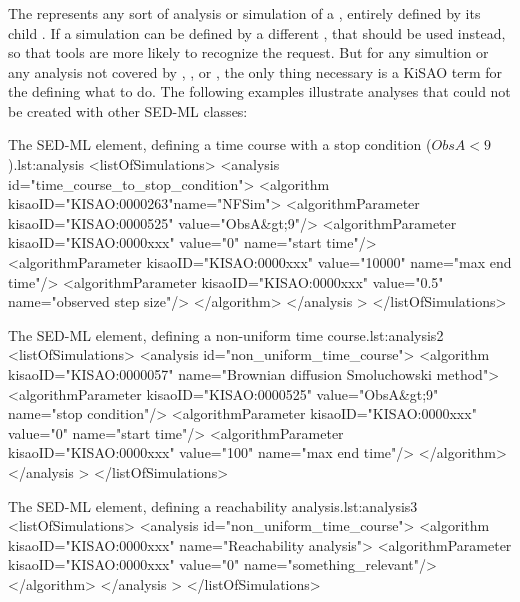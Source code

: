 \begin{blockChanged}
\subsubsection{}
\label{class:analysis}
The  represents any sort of analysis or simulation of a \Model, entirely defined by its child \Algorithm.  If a simulation can be defined by a different \Simulation, that should be used instead, so that tools are more likely to recognize the request.  But for any simultion or any analysis not covered by \SteadyState, \OneStep, or \UniformTimeCourse, the only thing necessary is a KiSAO term for the \Algorithm defining what to do.  The following examples illustrate analyses that could not be created with other SED-ML \Simulation classes:


\begin{myXmlLst}{The SED-ML  element, defining a time course with a stop condition ($ObsA<9$).}{lst:analysis}
<listOfSimulations>
    <analysis id="time_course_to_stop_condition">
        <algorithm kisaoID="KISAO:0000263"name="NFSim">
            <algorithmParameter kisaoID="KISAO:0000525" value="ObsA&gt;9"/>
            <algorithmParameter kisaoID="KISAO:0000xxx" value="0" name="start time"/>
            <algorithmParameter kisaoID="KISAO:0000xxx" value="10000" name="max end time"/>
            <algorithmParameter kisaoID="KISAO:0000xxx" value="0.5" name="observed step size"/>
        </algorithm>
    </analysis >
</listOfSimulations>
\end{myXmlLst}


\begin{myXmlLst}{The SED-ML  element, defining a non-uniform time course.}{lst:analysis2}
<listOfSimulations>
    <analysis id="non_uniform_time_course">
        <algorithm kisaoID="KISAO:0000057" name="Brownian diffusion Smoluchowski method">
            <algorithmParameter kisaoID="KISAO:0000525" value="ObsA&gt;9" name="stop condition"/>
            <algorithmParameter kisaoID="KISAO:0000xxx" value="0" name="start time"/>
            <algorithmParameter kisaoID="KISAO:0000xxx" value="100" name="max end time"/>
        </algorithm>
    </analysis >
</listOfSimulations>
\end{myXmlLst}


\begin{myXmlLst}{The SED-ML  element, defining a reachability analysis.}{lst:analysis3}
<listOfSimulations>
    <analysis id="non_uniform_time_course">
        <algorithm kisaoID="KISAO:0000xxx" name="Reachability analysis">
            <algorithmParameter kisaoID="KISAO:0000xxx" value="0" name="something_relevant"/>
        </algorithm>
    </analysis >
</listOfSimulations>
\end{myXmlLst}
\end{blockChanged}


